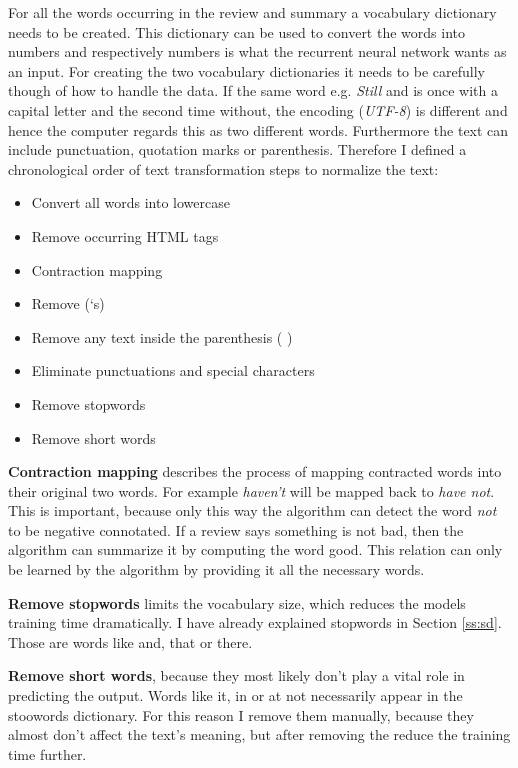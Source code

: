 For all the words occurring in the review and summary a vocabulary dictionary needs to be created. This dictionary can be used to convert the words into numbers and respectively numbers is what the recurrent neural network wants as an input. For creating the two vocabulary dictionaries it needs to be carefully though of how to handle the data. If the same word e.g. \textit{Still} and  is once with a capital letter and the second time without, the encoding (\textit{UTF-8}) is different and hence the computer regards this as two different words. Furthermore the text can include punctuation, quotation marks or parenthesis. Therefore I defined a chronological order of text transformation steps to normalize the text:

\begin{tcolorbox}
	\begin{itemize}
		\item Convert all words into lowercase
		\item Remove occurring HTML tags
		\item Contraction mapping
		\item Remove (‘s)
		\item Remove any text inside the parenthesis ( )
		\item Eliminate punctuations and special characters
		\item Remove stopwords
		\item Remove short words
	\end{itemize}
\end{tcolorbox}

\textbf{Contraction mapping} describes the process of mapping contracted words into their original two words. For example \textit{haven't} will be mapped back to \textit{have not}. This is important, because only this way the algorithm can detect the word \textit{not} to be negative connotated. If a review says something is not bad, then the algorithm can summarize it by computing the word good. This relation can only be learned by the algorithm by providing it all the necessary words.

\textbf{Remove stopwords} limits the vocabulary size, which reduces the models training time dramatically. I have already explained stopwords in Section \ref{ss:sd}. Those are words like and, that or there. 

\textbf{Remove short words}, because they most likely don't play a vital role in predicting the output. Words like it, in or at not necessarily appear in the stoowords dictionary. For this reason I remove them manually, because they almost don't affect the text's meaning, but after removing the reduce the training time further. 

